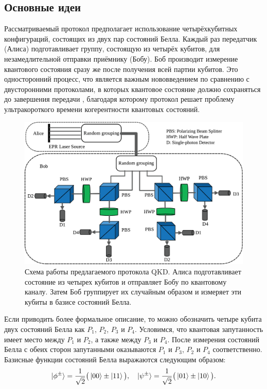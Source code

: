 \documentclass[a4paper,11pt]{article}
\begin{document}
\subsection{Основные идеи}
Рассматриваемый протокол предполагает использование четырёхкубитных конфигураций, состоящих из двух пар состояний Белла. Каждый раз передатчик (Алиса) подготавливает группу, состоящую из четырёх кубитов, для незамедлительной отправки приёмнику (Бобу). Боб производит измерение квантового состояния сразу же после получения всей партии кубитов. Это односторонний процесс, что является важным нововведением по сравнению с двусторонними протоколами, в которых квантовое состояние должно сохраняться до завершения передачи \cite{Gao,nine}, благодаря которому протокол решает проблему ультракороткого времени когерентности квантовых состояний.

\begin{figure}[h!]
	\centering    
	\includegraphics[width=0.64\columnwidth]{scheme.png}
	\caption{Схема работы предлагаемого протокола QKD. Алиса подготавливает состояние из четырех кубитов и отправляет Бобу по квантовому каналу. Затем Боб группирует их случайным образом и измеряет эти кубиты в базисе состояний Белла.}
	\label{im1}
\end{figure}

Если приводить более формальное описание, то можно обозначить четыре кубита двух состояний Белла как $P_1$, $P_2$, $P_3$ и $P_4$. Условимся, что квантовая запутанность имеет место между $P_1$ и $P_2$, а также между $P_3$ и $P_4$. После измерения состояний Белла с обеих сторон запутанными оказываются $P_1$ и $P_3$, $P_2$ и $P_4$ соответственно. Базисные функции состояний Белла выражаются следующим образом:
\begin{equation*}
\ket{\phi^{\pm}} = \dfrac{1}{\sqrt2}\big(\ket{00} \pm \ket{11} \big), \quad
\ket{\psi^{\pm}} = \dfrac{1}{\sqrt2}\big(\ket{01} \pm \ket{10} \big).
\end{equation*}
\end{document}
